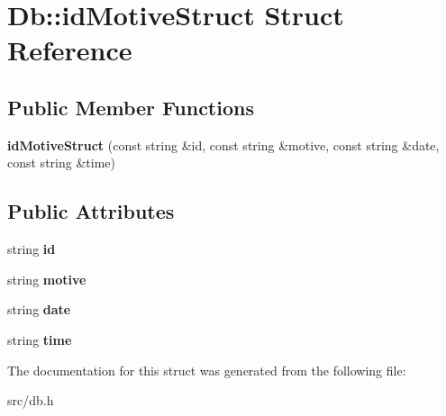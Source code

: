 \hypertarget{struct_db_1_1id_motive_struct}{
\section{Db::idMotiveStruct Struct Reference}
\label{struct_db_1_1id_motive_struct}
}
\subsection*{Public Member Functions}
\begin{DoxyCompactItemize}
\item 
\hypertarget{struct_db_1_1id_motive_struct_a475c0197ee2e6b5b398122257033e6bf}{
{\bfseries idMotiveStruct} (const string \&id, const string \&motive, const string \&date, const string \&time)}
\label{struct_db_1_1id_motive_struct_a475c0197ee2e6b5b398122257033e6bf}

\end{DoxyCompactItemize}
\subsection*{Public Attributes}
\begin{DoxyCompactItemize}
\item 
\hypertarget{struct_db_1_1id_motive_struct_a1728a5010a8e27d4c2eda82852215655}{
string {\bfseries id}}
\label{struct_db_1_1id_motive_struct_a1728a5010a8e27d4c2eda82852215655}

\item 
\hypertarget{struct_db_1_1id_motive_struct_a2050cdb58c289749881ebc64eb84c078}{
string {\bfseries motive}}
\label{struct_db_1_1id_motive_struct_a2050cdb58c289749881ebc64eb84c078}

\item 
\hypertarget{struct_db_1_1id_motive_struct_ada6577f10f24bf0d17e6108f1bf3109f}{
string {\bfseries date}}
\label{struct_db_1_1id_motive_struct_ada6577f10f24bf0d17e6108f1bf3109f}

\item 
\hypertarget{struct_db_1_1id_motive_struct_aa5e4294aa9de0df835d8404d7be63045}{
string {\bfseries time}}
\label{struct_db_1_1id_motive_struct_aa5e4294aa9de0df835d8404d7be63045}

\end{DoxyCompactItemize}


The documentation for this struct was generated from the following file:\begin{DoxyCompactItemize}
\item 
src/db.h\end{DoxyCompactItemize}
